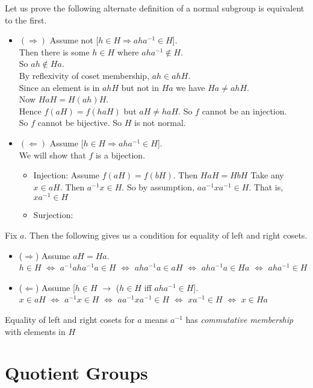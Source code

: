 Let us prove the following alternate definition of a normal subgroup is equivalent 
to the first.
\begin{itemize}
\item $(\Rightarrow)$  Assume not [$h \in H \Rightarrow aha^{-1} \in H$]. \\
Then there is some $h \in H$ where $aha^{-1} \notin H$. \\
So $ah \notin Ha$. \\
By reflexivity of coset membership, $ah \in ahH$. \\
Since an element is in $ahH$ but not in $Ha$ we have $Ha \neq ahH$. \\
Now $HaH = H(ah)H  $. \\
Hence $f(aH) = f(haH)$ but $aH \neq haH$. So $f$ cannot be an injection.\\ 
So $f$ cannot be bijective. So $H$ is not normal.

\item $(\Leftarrow)$  Assume [$h \in H \Rightarrow aha^{-1} \in H$]. \\
We will show that $f$ is a bijection.
\begin{itemize}
\item Injection: Assume $f(aH) = f(bH)$. Then $HaH = HbH$
Take any $x \in aH$. Then $a^{-1}x \in H$. 
So by assumption, $aa^{-1}xa^{-1} \in H$.  That is, $xa^{-1} \in H$
\item Surjection:
\end{itemize}
\end{itemize}

\frmrule 



\frmrule 

Fix $a$. Then the following gives us a condition for equality of left and right cosets. 

\begin{itemize}
\item ($\Rightarrow$) Assume $aH = Ha$. \\
$h \in H$ $\Leftrightarrow$
$a^{-1} a h a^{-1} a \in H$ $\Leftrightarrow$
$a h a^{-1} a \in aH$ $\Leftrightarrow$
$a h a^{-1} a \in Ha$ $\Leftrightarrow$
$a h a^{-1} \in H$ 


\item ($\Leftarrow$) Assume [$h \in H$ $\rightarrow$ ($h \in H$ iff $aha^{-1} \in H$]. \\
$x \in aH$ $\Leftrightarrow$
$a^{-1} x \in H$ $\Leftrightarrow$
$a a^{-1} x a^{-1} \in H$ $\Leftrightarrow$
$x a^{-1} \in H$ $\Leftrightarrow$
$x \in Ha$


\end{itemize}


Equality of left and right cosets for $a$ means $a^{-1}$ has \textit{commutative membership} with elements in $H$


\section{Quotient Groups}